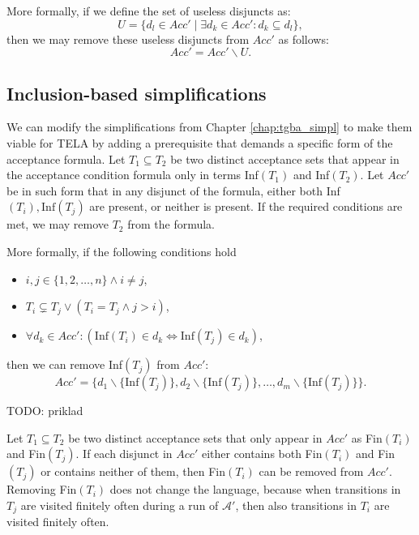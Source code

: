 \documentclass[
  digital, %
  twoside, %
  table,   %
  lof,     %
  lot,     %
]{fithesis3}
\begin{document}
More formally, if we define the set of useless disjuncts as:
\begin{equation*}
  U = \{d_l \in Acc' \mid \exists d_k \in Acc' \colon d_k \subseteq d_l\},
\end{equation*}
then we may remove these useless disjuncts from $Acc'$ as follows:
\begin{equation*}
  Acc' = Acc' \smallsetminus U.
\end{equation*}

\subsection{Inclusion-based simplifications}
We can modify the simplifications from Chapter \ref{chap:tgba_simpl} to make them viable for TELA by adding a prerequisite that demands a specific form of the acceptance formula. Let $T_1 \subseteq T_2$ be two distinct acceptance sets that appear in the acceptance condition formula only in terms Inf$(T_1)$ and Inf$(T_2)$. Let $Acc'$ be in such form that in any disjunct of the formula, either both Inf$(T_i), \text{Inf}(T_j)$ are present, or neither is present. If the required conditions are met, we may remove $T_2$ from the formula. 

More formally, if the following conditions hold
\begin{itemize}
  \item $i, j \in \{1, 2, \dots, n\} \wedge i \neq j$,
  \item $T_i \subsetneq T_j \vee (T_i = T_j \wedge j > i)$,
  \item $\forall d_k \in Acc' \colon (\text{Inf}(T_i) \in d_k \Leftrightarrow \text{Inf}(T_j) \in d_k)$,
\end{itemize}
then we can remove Inf$(T_j)$ from $Acc'$: 
\begin{equation*}
  Acc' = \{d_1 \smallsetminus \{\text{Inf}(T_j)\}, d_2 \smallsetminus \{\text{Inf}(T_j)\}, \dots, d_m \smallsetminus \{\text{Inf}(T_j)\}\}.
\end{equation*} 

TODO: priklad

Let $T_1 \subseteq T_2$ be two distinct acceptance sets that only appear in $Acc'$ as Fin$(T_i)$ and Fin$(T_j)$. If each disjunct in $Acc'$ either contains both Fin$(T_i)$ and Fin$(T_j)$ or contains neither of them, then Fin$(T_i)$ can be removed from $Acc'$.  Removing Fin$(T_i)$ does not change the language, because when transitions in $T_j$ are visited finitely often during a run of $\mathcal{A'}$, then also transitions in $T_i$ are visited finitely often. 
\end{document}
